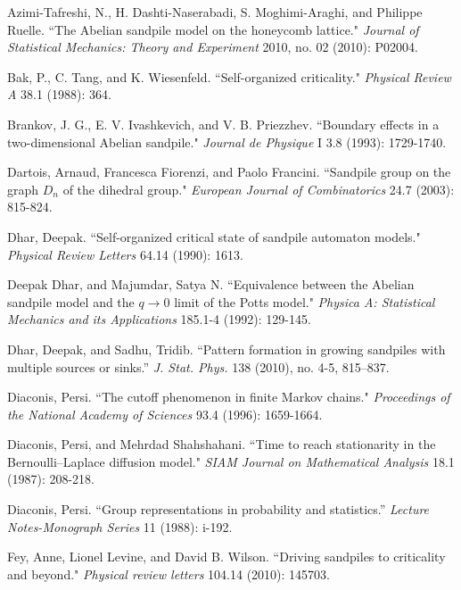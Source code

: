 \documentclass[a4paper, 12pt, notitlepage]{amsart}
\theoremstyle{remark}
\begin{document}

\begin{thebibliography}{1}

Azimi-Tafreshi, N., H. Dashti-Naserabadi, S. Moghimi-Araghi, and Philippe Ruelle. 
\newblock ``The Abelian sandpile model on the honeycomb lattice." 
\newblock \emph{Journal of Statistical Mechanics: Theory and Experiment} 2010, no. 02 (2010): P02004.

Bak, P., C. Tang, and K. Wiesenfeld. 
\newblock ``Self-organized criticality." 
\newblock \emph{Physical Review A} 38.1 (1988): 364.

Brankov, J. G., E. V. Ivashkevich, and V. B. Priezzhev. 
\newblock ``Boundary effects in a two-dimensional Abelian sandpile." 
\newblock \emph{Journal de Physique} I 3.8 (1993): 1729-1740.

Dartois, Arnaud, Francesca Fiorenzi, and Paolo Francini.
\newblock ``Sandpile group on the graph $D_n$ of the dihedral group." 
\newblock \emph{European Journal of Combinatorics} 24.7 (2003): 815-824.


Dhar, Deepak. 
\newblock ``Self-organized critical state of sandpile automaton models." 
\newblock \emph{Physical Review Letters} 64.14 (1990): 1613.


Deepak Dhar, and Majumdar, Satya N. 
\newblock ``Equivalence between the Abelian sandpile model and the $q\to 0$ limit of the Potts model." 
\newblock \emph{Physica A: Statistical Mechanics and its Applications} 185.1-4 (1992): 129-145.


Dhar, Deepak, and Sadhu, Tridib. 
\newblock ``Pattern formation in growing sandpiles with multiple sources or sinks.'' \emph{J. Stat. Phys.} 138 (2010), no. 4-5, 815--837. 

Diaconis, Persi. 
\newblock ``The cutoff phenomenon in finite Markov chains." \newblock \emph{Proceedings of the National Academy of Sciences} 93.4 (1996): 1659-1664.

Diaconis, Persi, and Mehrdad Shahshahani. 
\newblock ``Time to reach stationarity in the Bernoulli--Laplace diffusion model." 
\newblock \emph{SIAM Journal on Mathematical Analysis} 18.1 (1987): 208-218.

Diaconis, Persi. 
\newblock ``Group representations in probability and statistics.'' \emph{Lecture Notes-Monograph Series} 11 (1988): i-192.

Fey, Anne, Lionel Levine, and David B. Wilson.
\newblock ``Driving sandpiles to criticality and beyond." 
\newblock \emph{Physical review letters} 104.14 (2010): 145703.


\end{thebibliography}
\end{document}
